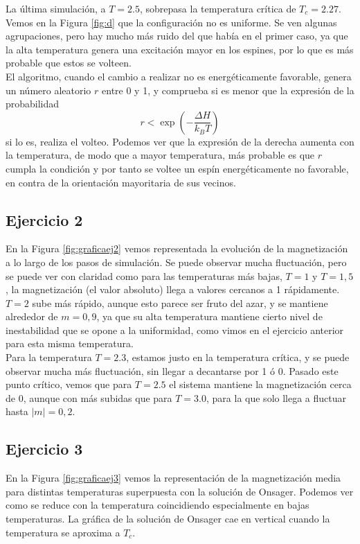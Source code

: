 \documentclass[a4paper,12pt,spanish]{article}
\begin{document}
La última simulación, a $T = 2.5$, sobrepasa la temperatura crítica de $T_c = 2.27$. Vemos en la Figura \ref{fig:d} que la configuración no es uniforme. Se ven algunas agrupaciones, pero hay mucho más ruido del que había en el primer caso, ya que la alta temperatura genera una excitación mayor en los espines, por lo que es más probable que estos se volteen.\\

El algoritmo, cuando el cambio a realizar no es energéticamente favorable, genera un número aleatorio $r$ entre 0 y 1, y comprueba si es menor que la expresión de la probabilidad
\[ r < \exp\left(-\frac{\Delta H}{k_B T}\right)
\]
si lo es, realiza el volteo. Podemos ver que la expresión de la derecha aumenta con la temperatura, de modo que a mayor temperatura, más probable es que $r$ cumpla la condición y por tanto se voltee un espín energéticamente no favorable, en contra de la orientación mayoritaria de sus vecinos.


\subsection{Ejercicio 2}

En la Figura \ref{fig:graficaej2} vemos representada la evolución de la magnetización a lo largo de los pasos de simulación. Se puede observar mucha fluctuación, pero se puede ver con claridad como para las temperaturas más bajas, $T = 1$ y $T = 1,5$, la magnetización (el valor absoluto) llega a valores cercanos a 1 rápidamente. $T = 2$ sube más rápido, aunque esto parece ser fruto del azar, y se mantiene alrededor de $m = 0,9$, ya que su alta temperatura mantiene cierto nivel de inestabilidad que se opone a la uniformidad, como vimos en el ejercicio anterior para esta misma temperatura. \\

Para la temperatura $T = 2.3$, estamos justo en la temperatura crítica, y se puede observar mucha más fluctuación, sin llegar a decantarse por 1 ó 0. Pasado este punto crítico, vemos que para $T = 2.5$ el sistema mantiene la magnetización cerca de 0, aunque con más subidas que para $T = 3.0$, para la que solo llega a fluctuar hasta $|m| = 0,2$.


\subsection{Ejercicio 3}

En la Figura \ref{fig:graficaej3} vemos la representación de la magnetización media para distintas temperaturas superpuesta con la solución de Onsager. Podemos ver como se reduce con la temperatura coincidiendo especialmente en bajas temperaturas. La gráfica de la solución de Onsager cae en vertical cuando la temperatura se aproxima a $T_c$.
\end{document}
